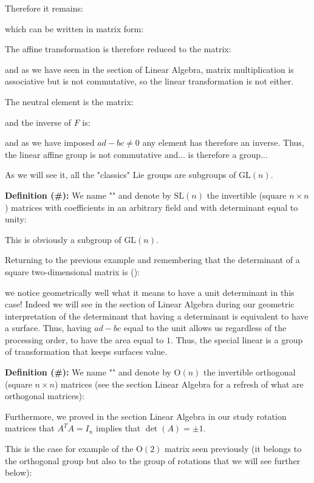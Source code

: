 	Therefore it remains:
	
	which can be written in matrix form:
	
	The affine transformation is therefore reduced to the matrix:
	
	and as we have seen in the section of Linear Algebra, matrix multiplication is associative but is not commutative, so the linear transformation is not either.
	
	The neutral element is the matrix:
	
	and the inverse of $F$ is:
	
	and as we have imposed $ad-bc\neq 0$ any element has therefore an inverse. Thus, the linear affine group is not commutative and... is therefore a group...
	
	As we will see it, all the "classics" Lie groups are subgroups of $\text{GL} (n)$.
	
	\textbf{Definition (\#\mydef):} We name "" and denote by $\text{SL} (n)$ the invertible (square $n\times n$) matrices with coefficients in an arbitrary field and with determinant equal to unity:
	
	This is obviously a subgroup of $\text{GL} (n)$.
	
	Returning to the previous example and remembering that the determinant of a square two-dimensional matrix is ():
	
	we notice geometrically well what it means to have a unit determinant in this case! Indeed we will see in the section of Linear Algebra during our geometric interpretation of the determinant that having a determinant is equivalent to have a surface. Thus, having $ad-bc$ equal to the unit allows us regardless of the processing order, to have the area equal to $1$. Thus, the special linear is a group of transformation that keeps surfaces value.
	
	\textbf{Definition (\#\mydef):} We name "" and denote by $\text{O} (n)$ the invertible orthogonal (square $n\times n$) matrices (see the section Linear Algebra for a refresh of what are orthogonal matrices):
	
	Furthermore, we proved in the section Linear Algebra in our study rotation matrices that $A^TA=I_n$ implies that $\det(A)=\pm 1$.
	
	This is the case for example of the $\text{O}(2)$ matrix seen previously (it belongs to the orthogonal group but also to the group of rotations that we will see further below):
	
